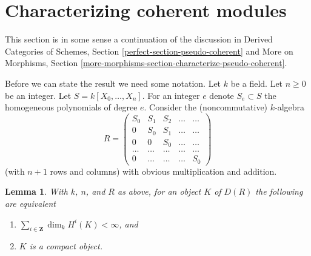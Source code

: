 \documentclass{stacks-project}
\theoremstyle{plain}
\newtheorem{lemma}[subsection]{Lemma}
\theoremstyle{definition}
\theoremstyle{remark}
\numberwithin{equation}{subsection}
\begin{document}
\section{Characterizing coherent modules}
\label{section-coherent}

\noindent
This section is in some sense a continuation of the discussion
in Derived Categories of Schemes, Section \ref{perfect-section-pseudo-coherent}
and More on Morphisms, Section
\ref{more-morphisms-section-characterize-pseudo-coherent}.

\medskip\noindent
Before we can state the result we need some notation.
Let $k$ be a field. Let $n \geq 0$ be an integer.
Let $S = k[X_0, \ldots, X_n]$. For an integer $e$ denote
$S_e \subset S$ the homogeneous polynomials of degree $e$.
Consider the (noncommutative) $k$-algebra
$$
R =
\left(
\begin{matrix}
S_0 & S_1 & S_2 & \ldots & \ldots \\
0 & S_0 & S_1 & \ldots & \ldots\\
0 & 0 & S_0 & \ldots & \ldots \\
\ldots & \ldots & \ldots & \ldots & \ldots \\
0 & \ldots & \ldots & \ldots & S_0
\end{matrix}
\right)
$$
(with $n + 1$ rows and columns) with obvious multiplication and addition.

\begin{lemma}
\label{lemma-perfect-for-R}
With $k$, $n$, and $R$ as above, for an object $K$ of $D(R)$
the following are equivalent
\begin{enumerate}
\item $\sum_{i \in \mathbf{Z}} \dim_k H^i(K) < \infty$, and
\item $K$ is a compact object.
\end{enumerate}
\end{lemma}
\end{document}
